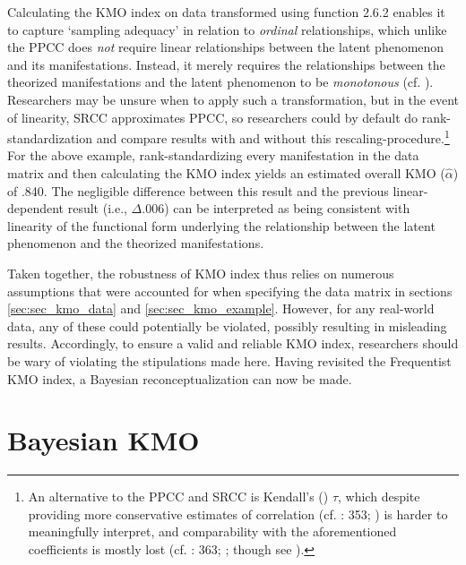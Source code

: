 \documentclass[
  10pt,
  a4paper,
  twoside]{article}
\begin{document}
Calculating the KMO index on data transformed using function 2.6.2 enables it to capture `sampling adequacy' in relation to \emph{ordinal} relationships, which unlike the PPCC does \emph{not} require linear relationships between the latent phenomenon and its manifestations. Instead, it merely requires the relationships between the theorized manifestations and the latent phenomenon to be \emph{monotonous} (cf. ). Researchers may be unsure when to apply such a transformation, but in the event of linearity, SRCC approximates PPCC, so researchers could by default do rank-standardization and compare results with and without this rescaling-procedure.\footnote{An alternative to the PPCC and SRCC is Kendall's () \(\tau\), which despite providing more conservative estimates of correlation (cf. : 353; ) is harder to meaningfully interpret, and comparability with the aforementioned coefficients is mostly lost (cf. : 363; ; though see ).} For the above example, rank-standardizing every manifestation in the data matrix and then calculating the KMO index yields an estimated overall KMO (\(\hat{\alpha}\)) of .840. The negligible difference between this result and the previous linear-dependent result (i.e., \(\Delta\).006) can be interpreted as being consistent with linearity of the functional form underlying the relationship between the latent phenomenon and the theorized manifestations.

Taken together, the robustness of KMO index thus relies on numerous assumptions that were accounted for when specifying the data matrix in sections \ref{sec:sec_kmo_data} and \ref{sec:sec_kmo_example}. However, for any real-world data, any of these could potentially be violated, possibly resulting in misleading results. Accordingly, to ensure a valid and reliable KMO index, researchers should be wary of violating the stipulations made here. Having revisited the Frequentist KMO index, a Bayesian reconceptualization can now be made.

\section{Bayesian KMO}\label{sec:sec_bkmo}
\end{document}

